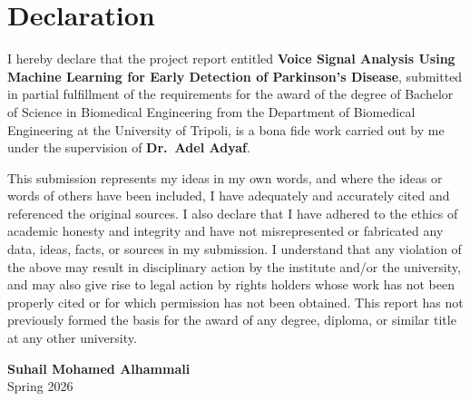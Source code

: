 \chapter*{Declaration}%
I hereby declare that the project report entitled {\bf Voice Signal
Analysis Using Machine Learning for Early Detection of Parkinson's
Disease}, submitted in partial fulfillment of the requirements for the
award of the degree of Bachelor of Science in Biomedical Engineering from
the Department of Biomedical Engineering at the University of Tripoli, is
a bona fide work carried out by me under the supervision of {\bf Dr.\
Adel Adyaf}.\vspace{2pt}

This submission represents my ideas in my own words, and where the ideas
or words of others have been included, I have adequately and accurately
cited and referenced the original sources. I also declare that I have
adhered to the ethics of academic honesty and integrity and have not
misrepresented or fabricated any data, ideas, facts, or sources in my
submission. I understand that any violation of the above may result in
disciplinary action by the institute and/or the university, and may also
give rise to legal action by rights holders whose work has not been
properly cited or for which permission has not been obtained. This report
has not previously formed the basis for the award of any degree, diploma,
or similar title at any other university.

\noindent \begin{minipage}{0.45\linewidth}
\begin{flushleft}
\vspace{1.5cm}
\end{flushleft}
\end{minipage}
\hfill
\begin{minipage}{0.45\linewidth}
\begin{flushright}
\centering \textbf{Suhail Mohamed Alhammali}\\
Spring 2026\\
\end{flushright}
\end{minipage}
\thispagestyle{plain}
